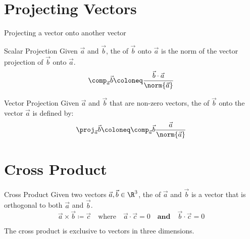 \documentclass[math]{amznotes}
\begin{document}
\section{Projecting Vectors}
\newcommand{\vectorproj}[2][]{\textit{proj}_{\vect{#1}}\vect{#2}}

Projecting a vector onto another vector

\begin{dfnbox}{Scalar Projection}{}
    Given $\vec{a}$ and $\vec{b}$, the  of $\vec{b}$ onto $\vec{a}$ is the norm of the vector projection of $\vec{b}$ onto $\vec{a}$.
    \tcblower
    \[ \comp_{\vec{a}} \vec{b} \coloneq \frac{\vec{b} \cdot \vec{a}}{\norm{\vec{a}}} \]
\end{dfnbox}

\begin{dfnbox}{Vector Projection}{}
    Given $\vec{a}$ and $\vec{b}$ that are non-zero vectors, the  of $\vec{b}$ onto the vector $\vec{a}$ is defined by:
    \[ \proj_{\vec{a}} \vec{b} \coloneq \comp_{\vec{a}} \vec{b} \frac{\vec{a}}{\norm{\vec{a}}} \]
\end{dfnbox}

\section{Cross Product}

\begin{dfnbox}{Cross Product}{}
    Given two vectors $\vec{a}, \vec{b} \in \R^3$, the  of $\vec{a}$ and $\vec{b}$ is a vector that is orthogonal to both $\vec{a}$ and $\vec{b}$.
    \tcblower
    \[ \vec{a} \times \vec{b} \coloneq \vec{c} \quad \text{where} \quad \vec{a} \cdot \vec{c} = 0 \quad \textbf{and} \quad \vec{b} \cdot \vec{c} = 0 \]
\end{dfnbox}

The cross product is exclusive to vectors in three dimensions.
\end{document}
